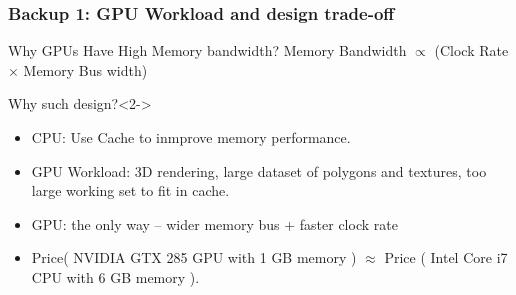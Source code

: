 \begin{frame}
\frametitle{Backup 1: GPU Workload and design trade-off}
\begin{block}{Why GPUs Have High Memory bandwidth?}
Memory Bandwidth $\propto$ (Clock Rate $\times$ Memory Bus width)
\end{block}
\begin{block}{Why such design?}<2->
\begin{itemize}
\item<3-> CPU: Use \alert{Cache} to inmprove memory performance.
\item<4-> GPU Workload: 3D rendering, large dataset of polygons and textures, too large working set to fit in cache.
\item<5-> GPU: the only way -- wider memory bus + faster clock rate
\item<6-> Price( NVIDIA GTX 285 GPU with \alert{1 GB} memory ) \alert{$\approx$} Price ( Intel Core i7 CPU with \alert{6 GB} memory ).
\end{itemize}
\end{block}
\end{frame}

